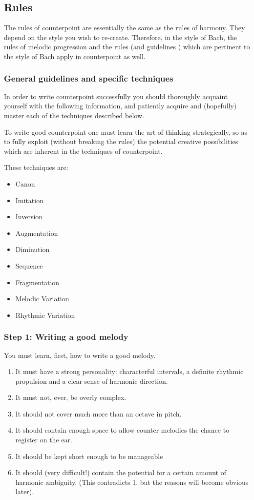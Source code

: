 \documentclass{article}
\begin{document}
\subsection{Rules}

The rules of counterpoint are essentially the same as the rules of harmony.
They depend on the style you wish to re-create.
Therefore, in the style of Bach, the rules of melodic progression and the rules (and guidelines ) which are pertinent to the style of Bach apply in counterpoint as well.

\subsubsection{General guidelines and specific techniques}

In order to write counterpoint successfully you should thoroughly acquaint yourself with the following information, and patiently acquire and (hopefully) master each of the techniques described below.

To write good counterpoint one must learn the art of thinking strategically, so as to fully exploit (without breaking the rules) the potential creative possibilities which are inherent in the techniques of counterpoint.

These techniques are:
\begin{itemize}
    \item Canon
    \item Imitation
    \item Inversion
    \item Augmentation
    \item Diminution
    \item Sequence
    \item Fragmentation
    \item Melodic Variation
    \item Rhythmic Variation
\end{itemize}

\subsubsection{Step 1: Writing a good melody}

You must learn, first, how to write a good melody.

\begin{enumerate}
    \item It must have a strong personality: characterful intervals, a definite rhythmic propulsion and a clear sense of harmonic direction.
    \item It must not, ever, be overly complex.
    \item It should not cover much more than an octave in pitch.
    \item It should contain enough space to allow counter melodies the chance to register on the ear.
    \item It should be kept short enough to be manageable
    \item It should (very difficult!) contain the potential for a certain amount of harmonic ambiguity.
        (This contradicts 1, but the reasons will become obvious later).
\end{enumerate}
\end{document}
